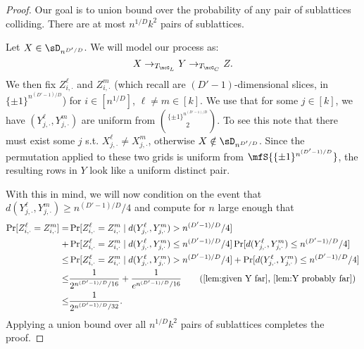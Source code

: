 \begin{proof}
    Our goal is to union bound over the probability of any pair of sublattices colliding. There are at most $n^{1/D}k^2$ pairs of sublattices. 
    
    Let $X \in \sD_{n^{D'/D}}$. We will model our process as:
    \begin{equation*}
        X \to_{T_{\mcG_L}} Y \to_{T_{\mcG_C}} Z.
    \end{equation*}
    We then fix $Z^\ell_{i, \cdot}$ and $Z^m_{i, \cdot}$ (which recall are $(D'-1)$-dimensional slices, in $\{\pm1\}^{n^{(D'-1)/D}}$) for $i \in [n^{1/D}]$, $\ell \neq m \in [k]$. We use that for some $j \in [k]$, we have $(Y^\ell_{j, \cdot}, Y^m_{j, \cdot})$ are uniform from ${\{\pm1\}^{n^{(D'-1)/D}} \choose 2}$. To see this note that there must exist some $j$ s.t. $X^\ell_{j, \cdot} \neq X^m_{j,\cdot}$, otherwise $X \notin \sD_{n^{D'/D}}$. Since the permutation applied to these two grids is uniform from $\mfS{\{\pm1\}^{n^{(D'-1)/D}}}$, the resulting rows in $Y$ look like a uniform distinct pair.
    
    With this in mind, we will now condition on the event that $d(Y^\ell_{j, \cdot}, Y^m_{j, \cdot}) \geq n^{(D'-1)/D}/4$ and compute for $n$ large enough that
    \begin{align*}
        \Pr[Z^\ell_{i, \cdot} = Z^m_{i, \cdot}] =& \Pr[Z^\ell_{i, \cdot} = Z^m_{i, \cdot} \mid d(Y^\ell_{j, \cdot}, Y^m_{j, \cdot}) > n^{(D'-1)/D}/4] \\
        +& \Pr[Z^\ell_{i, \cdot} = Z^m_{i, \cdot} \mid d(Y^\ell_{j, \cdot}, Y^m_{j, \cdot}) \leq n^{(D'-1)/D}/4]\Pr[d(Y^\ell_{j, \cdot}, Y^m_{j, \cdot}) \leq n^{(D'-1)/D}/4]\\
        \leq&\Pr[Z^\ell_{i, \cdot} = Z^m_{i, \cdot} \mid d(Y^\ell_{j, \cdot}, Y^m_{j, \cdot}) > n^{(D'-1)/D}/4] +\Pr[d(Y^\ell_{j, \cdot}, Y^m_{j, \cdot}) \leq n^{(D'-1)/D}/4]\\
        \leq&\frac{1}{2^{n^{(D'-1)/D}/16}}+\frac1{e^{n^{(D'-1)/D}/16}}\tag{\Cref{lem:given Y far}, \Cref{lem:Y probably far}}\\
        \leq&\frac{1}{2^{n^{(D'-1)/D}/32}}.
    \end{align*}
    Applying a union bound over all $n^{1/D}k^2$ pairs of sublattices completes the proof.
\end{proof}


